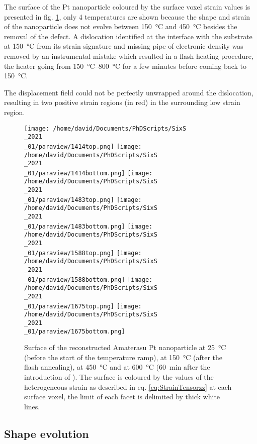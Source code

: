 The surface of the Pt nanoparticle coloured by the surface voxel strain values is presented in fig. \ref{fig:Amaterasu}, only 4 temperatures are shown because the shape and strain of the nanoparticle does not evolve between \qty{150}{\degreeCelsius} and \qty{450}{\degreeCelsius} besides the removal of the defect.
A dislocation identified at the interface with the substrate at \qty{150}{\degreeCelsius} from its strain signature and missing pipe of electronic density \parencite{Dupraz2015} was removed by an instrumental mistake which resulted in a flash heating procedure, the heater going from \qtyrange{150}{800}{\degreeCelsius} for a few minutes before coming back to \qty{150}{\degreeCelsius}.

The displacement field could not be perfectly unwrapped around the dislocation, resulting in two positive strain regions (in red) in the surrounding low strain region.

\begin{figure}[!htb]
    \centering
    \texttt{[image: /home/david/Documents/PhDScripts/SixS\\\_2021\\\_01/paraview/1414top.png]}
    \texttt{[image: /home/david/Documents/PhDScripts/SixS\\\_2021\\\_01/paraview/1414bottom.png]}
    \texttt{[image: /home/david/Documents/PhDScripts/SixS\\\_2021\\\_01/paraview/1483top.png]}
    \texttt{[image: /home/david/Documents/PhDScripts/SixS\\\_2021\\\_01/paraview/1483bottom.png]}
    \texttt{[image: /home/david/Documents/PhDScripts/SixS\\\_2021\\\_01/paraview/1588top.png]}
    \texttt{[image: /home/david/Documents/PhDScripts/SixS\\\_2021\\\_01/paraview/1588bottom.png]}
    \texttt{[image: /home/david/Documents/PhDScripts/SixS\\\_2021\\\_01/paraview/1675top.png]}
    \texttt{[image: /home/david/Documents/PhDScripts/SixS\\\_2021\\\_01/paraview/1675bottom.png]}
    \caption{
        Surface of the reconstructed Amaterasu Pt nanoparticle at \qty{25}{\degreeCelsius} (before the start of the temperature ramp), at \qty{150}{\degreeCelsius} (after the flash annealing), at \qty{450}{\degreeCelsius} and at \qty{600}{\degreeCelsius} (\qty{60}{\minute} after the introduction of \ammonia).
        The surface is coloured by the values of the heterogeneous strain as described in eq. \ref{eq:StrainTensorzz} at each surface voxel, the limit of each facet is delimited by thick white lines.
    }
    \label{fig:Amaterasu}
\end{figure}

\subsection{Shape evolution}

